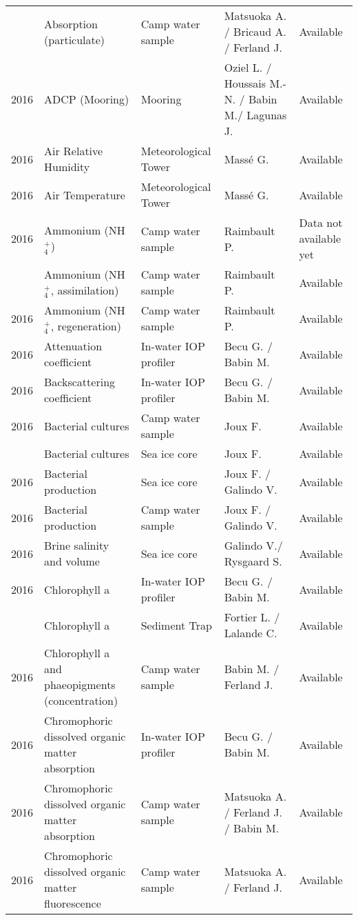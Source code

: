 \documentclass[]{article}
\begin{document}
\begin{landscape}
\begin{longtable}[t]{rllll}
\addlinespace
2016 & Absorption (particulate) & Camp water sample & Matsuoka A. / Bricaud A. / Ferland J. & Available\\
2016 & ADCP (Mooring) & Mooring & Oziel L. / Houssais M.-N. / Babin M./ Lagunas J. & Available\\
2016 & Air Relative Humidity & Meteorological Tower & Massé G. & Available\\
2016 & Air Temperature & Meteorological Tower & Massé G. & Available\\
2016 & Ammonium (NH$^+_4$) & Camp water sample & Raimbault P. & Data not available yet\\
\addlinespace
2016 & Ammonium (NH$^+_4$, assimilation) & Camp water sample & Raimbault P. & Available\\
2016 & Ammonium (NH$^+_4$, regeneration) & Camp water sample & Raimbault P. & Available\\
2016 & Attenuation coefficient & In-water IOP profiler & Becu G. / Babin M. & Available\\
2016 & Backscattering coefficient & In-water IOP profiler & Becu G. / Babin M. & Available\\
2016 & Bacterial cultures & Camp water sample & Joux F. & Available\\
\addlinespace
2016 & Bacterial cultures & Sea ice core & Joux F. & Available\\
2016 & Bacterial production & Sea ice core & Joux F. / Galindo V. & Available\\
2016 & Bacterial production & Camp water sample & Joux F. / Galindo V. & Available\\
2016 & Brine salinity and volume & Sea ice core & Galindo V./ Rysgaard S. & Available\\
2016 & Chlorophyll a & In-water IOP profiler & Becu G. / Babin M. & Available\\
\addlinespace
2016 & Chlorophyll a & Sediment Trap & Fortier L. / Lalande C. & Available\\
2016 & Chlorophyll a and phaeopigments (concentration) & Camp water sample & Babin M. / Ferland J. & Available\\
2016 & Chromophoric dissolved organic matter absorption & In-water IOP profiler & Becu G. / Babin M. & Available\\
2016 & Chromophoric dissolved organic matter absorption & Camp water sample & Matsuoka A. / Ferland J. / Babin M. & Available\\
2016 & Chromophoric dissolved organic matter fluorescence & Camp water sample & Matsuoka A. / Ferland J. & Available\\

\end{longtable}
\end{landscape}
\end{document}
